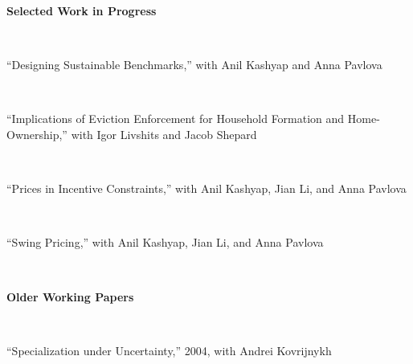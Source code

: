 \documentclass[11pt]{article}
\begin{document}
\textbf{Selected Work in Progress}



 
\ \

``Designing Sustainable Benchmarks,'' with  Anil Kashyap and Anna Pavlova

\ \ 


``Implications of Eviction Enforcement for Household Formation and Home-Ownership,'' with Igor Livshits and Jacob Shepard
 
 
\ \

``Prices in Incentive Constraints,'' with  Anil Kashyap, Jian Li, and Anna Pavlova

\ \

``Swing Pricing,'' with  Anil Kashyap, Jian Li, and Anna Pavlova

\ \




\medskip

\textbf{Older Working Papers}

\ \ 

``Specialization under Uncertainty,'' 2004, with Andrei Kovrijnykh

\ \


%
%
%
%
%
%
%
%
%
%
%
%
%
%
%
%
%
%
%
%
%
% 
%
%
%
%
%
%
%
%
\end{document}
